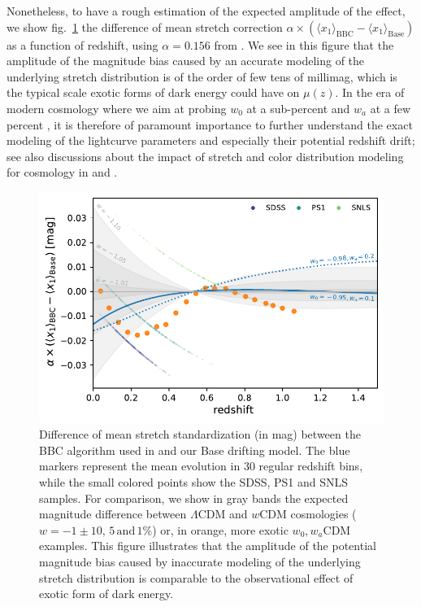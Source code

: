 \documentclass[]{aa} %
\newcommand{\mr}[1]{{\textcolor[rgb]{0.60,0.10,0.6}{#1}}}
\begin{document}
\mr{Nonetheless, to have a rough estimation of the expected amplitude of the
effect, we show fig.~\ref{fig:magdrift} the difference of mean stretch
correction $\alpha\times\left(\langle x_1 \rangle_{\mathrm{BBC}} - \langle x_1
\rangle_{\mathrm{Base}}\right)$ as a function of redshift, using $\alpha=0.156$
from \cite{scolnic2018a}. We see in this figure that the amplitude of the
magnitude bias caused by an accurate modeling of the underlying stretch
distribution is of the order of few tens of millimag, which is the typical scale
exotic forms of dark energy could have on $\mu(z)$. In the era of modern
cosmology where we aim at probing $w_0$ at a sub-percent and $w_a$ at a few
percent \citep[e.g.,][]{lsstpaper}, it is therefore of paramount importance to
further understand the exact modeling of the lightcurve parameters and
especially their potential redshift drift; see also discussions about the impact
of stretch and color distribution modeling for cosmology in \citealt{rubin2015}
and \citealt{rubin2016}.}

\begin{figure}
    \centering
    \includegraphics[width=\linewidth]{Article_figures/BBC_distmod_w0wa.pdf}
    \caption{ Difference of mean stretch standardization (in mag) between the
        BBC algorithm used in \cite{scolnic2018a} and our Base drifting model.
        The blue markers represent the mean evolution in 30 regular redshift
        bins, while the small colored points show the SDSS, PS1 and SNLS
        samples. For comparison, we show in gray bands the expected magnitude
        difference between $\Lambda$CDM  and $w$CDM cosmologies ($w=-1\pm
        10,\,5\,\mathrm{and}\,1\%$) or, in orange, more exotic $w_0,w_a$CDM
        examples.  This figure illustrates that the amplitude of the potential
    magnitude bias caused by inaccurate modeling of the underlying stretch
distribution is comparable to the observational effect of exotic form of dark
energy.}
    \label{fig:magdrift}
\end{figure}
\end{document}
